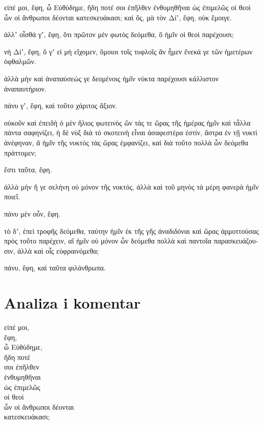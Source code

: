 {\large

\begin{greek}

\noindent εἰπέ μοι, ἔφη, ὦ Εὐθύδημε, ἤδη ποτέ σοι ἐπῆλθεν ἐνθυμηθῆναι ὡς ἐπιμελῶς οἱ θεοὶ ὧν οἱ ἄνθρωποι δέονται κατεσκευάκασι; καὶ ὅς, μὰ τὸν Δίʼ, ἔφη, οὐκ ἔμοιγε. 

ἀλλʼ οἶσθά γʼ, ἔφη, ὅτι πρῶτον μὲν φωτὸς δεόμεθα, ὃ ἡμῖν οἱ θεοὶ παρέχουσι; 

νὴ Δίʼ, ἔφη, ὅ γʼ εἰ μὴ εἴχομεν, ὅμοιοι τοῖς τυφλοῖς ἂν ἦμεν ἕνεκά γε τῶν ἡμετέρων ὀφθαλμῶν. 

ἀλλὰ μὴν καὶ ἀναπαύσεώς γε δεομένοις ἡμῖν νύκτα παρέχουσι κάλλιστον ἀναπαυτήριον.

πάνυ γʼ, ἔφη, καὶ τοῦτο χάριτος ἄξιον. 

οὐκοῦν καὶ ἐπειδὴ ὁ μὲν ἥλιος φωτεινὸς ὢν τάς τε ὥρας τῆς ἡμέρας ἡμῖν καὶ τἆλλα πάντα σαφηνίζει, ἡ δὲ νὺξ διὰ τὸ σκοτεινὴ εἶναι ἀσαφεστέρα ἐστίν, ἄστρα ἐν τῇ νυκτὶ ἀνέφηναν, ἃ ἡμῖν τῆς νυκτὸς τὰς ὥρας ἐμφανίζει, καὶ διὰ τοῦτο πολλὰ ὧν δεόμεθα πράττομεν; 

ἔστι ταῦτα, ἔφη. 

ἀλλὰ μὴν ἥ γε σελήνη οὐ μόνον τῆς νυκτός, ἀλλὰ καὶ τοῦ μηνὸς τὰ μέρη φανερὰ ἡμῖν ποιεῖ.

πάνυ μὲν οὖν, ἔφη. 

τὸ δʼ, ἐπεὶ τροφῆς δεόμεθα, ταύτην ἡμῖν ἐκ τῆς γῆς ἀναδιδόναι καὶ ὥρας ἁρμοττούσας πρὸς τοῦτο παρέχειν, αἳ ἡμῖν οὐ μόνον ὧν δεόμεθα πολλὰ καὶ παντοῖα παρασκευάζουσιν, ἀλλὰ καὶ οἷς εὐφραινόμεθα;

πάνυ, ἔφη, καὶ ταῦτα φιλάνθρωπα.

\end{greek}

}


\section*{Analiza i komentar}



{\large
\begin{greek}
\noindent εἰπέ μοι, \\
\tabto{2em} ἔφη, \\
ὦ Εὐθύδημε, \\
ἤδη ποτέ \\
\tabto{2em} σοι ἐπῆλθεν \\
\tabto{4em} ἐνθυμηθῆναι \\
\tabto{6em} ὡς ἐπιμελῶς \\
\tabto{6em} οἱ θεοὶ \\
\tabto{8em} ὧν οἱ ἄνθρωποι δέονται \\
\tabto{6em} κατεσκευάκασι;\\

\end{greek}
}

